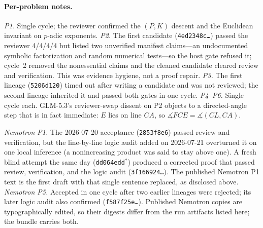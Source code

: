 \paragraph{Per-problem notes.}
\emph{P1.} Single cycle; the reviewer confirmed the $(P,K)$ descent and the Euclidean invariant on $p$-adic exponents. \emph{P2.} The first candidate (\texttt{4ed2348c\ldots}) passed the reviewer 4/4/4/4 but listed two unverified manifest claims---an undocumented symbolic factorization and random numerical tests---so the host gate refused it; cycle~2 removed the nonessential claims and the cleaned candidate cleared review and verification. This was evidence hygiene, not a proof repair. \emph{P3.} The first lineage (\texttt{5206d120}) timed out after writing a candidate and was not reviewed; the second lineage inherited it and passed both gates in one cycle. \emph{P4--P6.} Single cycle each. GLM-5.3's reviewer-swap dissent on P2 objects to a directed-angle step that is in fact immediate: $E$ lies on line $CA$, so $\measuredangle FCE=\measuredangle(CL,CA)$.

\emph{Nemotron P1.} The 2026-07-20 acceptance (\texttt{2853f8e6}) passed review and verification, but the line-by-line logic audit added on 2026-07-21 overturned it on one local inference (a nonincreasing product was said to stay above one). A fresh blind attempt the same day (\texttt{dd064edd}$^{*}$) produced a corrected proof that passed review, verification, and the logic audit (\texttt{3f166924\ldots}). The published Nemotron P1 text is the first draft with that single sentence replaced, as disclosed above. \emph{Nemotron P5.} Accepted in one cycle after two earlier lineages were rejected; its later logic audit also confirmed (\texttt{f587f25e\ldots}). Published Nemotron copies are typographically edited, so their digests differ from the run artifacts listed here; the bundle carries both.


